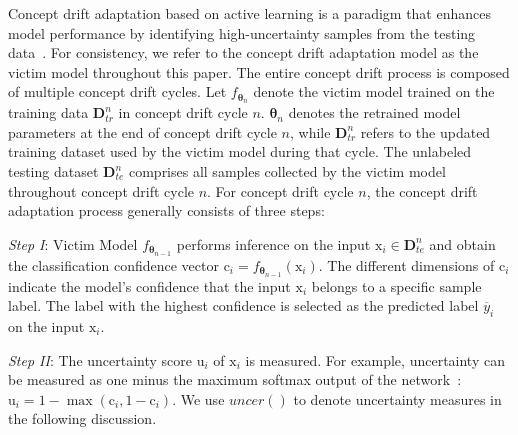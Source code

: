 \documentclass[conference,compsoc]{IEEEtran} %
\begin{document}
Concept drift adaptation based on active learning is a paradigm that enhances model performance by identifying high-uncertainty samples from the testing data~\cite{2023-Usenix-chenyizhen,park2016active,vzliobaite2013active}.
For consistency, we refer to the concept drift adaptation model as the victim model throughout this paper.
The entire concept drift process is composed of multiple concept drift cycles.
Let $f_{\bm{\theta}_{n}}$ denote the victim model trained on the training data $\bm{D}^{n}_{tr}$ in concept drift cycle $n$.
$\bm{\theta}_{n}$ denotes the retrained model parameters at the end of concept drift cycle $n$, while $\bm{D}^{n}_{tr}$ refers to the updated training dataset used by the victim model during that cycle.
The unlabeled testing dataset $\bm{D}_{te}^{n}$ comprises all samples collected by the victim model throughout concept drift cycle $n$.
For concept drift cycle $n$, the concept drift adaptation process generally consists of three steps:

\emph{Step I}: Victim Model $f_{\bm{\theta}_{n-1}}$ performs inference on the input $\bm{\mathrm{x}}_{i} \in \bm{D}_{te}^{n}$ and obtain the classification confidence vector $\bm{\mathrm{c}}_{i} = f_{\bm{\theta}_{n-1}} \left( \bm{\mathrm{x}}_{i} \right)$.
	The different dimensions of $\bm{\mathrm{c}}_{i}$ indicate the model's confidence that the input $\bm{\mathrm{x}}_{i}$ belongs to a specific sample label. 
	The label with the highest confidence is selected as the predicted label $\overline{y}_{i}$ on the input $\bm{\mathrm{x}}_{i}$.

\emph{Step II}: %
	The uncertainty score $\bm{\mathrm{u}}_{i}$ of $\bm{\mathrm{x}}_{i}$ is measured.
	For example, uncertainty can be measured as one minus the maximum softmax output of the network~\cite{2023-Usenix-chenyizhen}:
$\bm{\mathrm{u}}_{i} = 1-\max(\bm{\mathrm{c}}_{i},1-\bm{\mathrm{c}}_{i})$.
	We use $uncer()$ to denote uncertainty measures in the following discussion.
\end{document}
